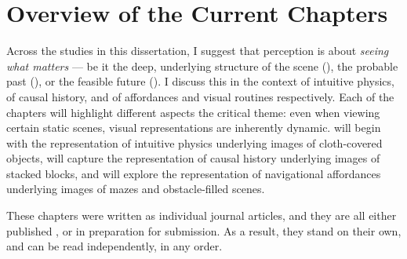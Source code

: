 \section{Overview of the Current Chapters}

Across the studies in this dissertation, I suggest that perception is about \textit{seeing what matters} --- be it the deep, underlying structure of the scene (), the probable past (), or the feasible future  ().  I discuss this in the context of intuitive physics, of causal history, and of affordances and visual routines respectively.  Each of the chapters will highlight different aspects the critical theme: even when viewing certain static scenes, visual representations are inherently dynamic.   will begin with the representation of intuitive physics underlying images of cloth-covered objects,  will capture the representation of causal history underlying images of stacked blocks, and  will explore the representation of navigational affordances underlying images of mazes and obstacle-filled scenes.

These chapters were written as individual journal articles, and they are all either published \parencite{wong_seeing_2023, wong_spontaneous_2024}, or in preparation for submission.  As a result, they stand on their own, and can be read independently, in any order. 

